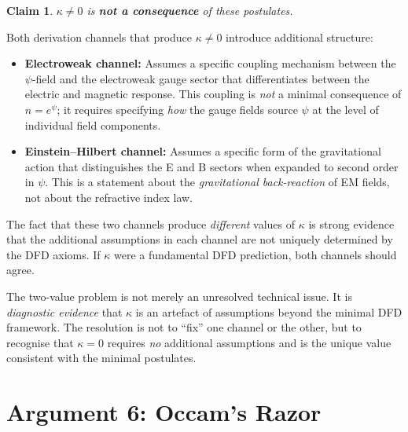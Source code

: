 \documentclass[12pt,a4paper]{article}
\newtheorem{claim}{Claim}
\theoremstyle{definition}
\theoremstyle{remark}
\begin{document}
\begin{claim}
$\kappa \neq 0$ is \textbf{not a consequence} of these postulates.
\end{claim}

Both derivation channels that produce $\kappa \neq 0$ introduce
additional structure:
\begin{itemize}
\item \textbf{Electroweak channel:} Assumes a specific coupling mechanism
  between the $\psi$-field and the electroweak gauge sector that
  differentiates between the electric and magnetic response.  This
  coupling is \emph{not} a minimal consequence of $n = e^\psi$; it
  requires specifying \emph{how} the gauge fields source $\psi$ at the
  level of individual field components.
\item \textbf{Einstein--Hilbert channel:} Assumes a specific form of the
  gravitational action that distinguishes the E and B sectors when
  expanded to second order in $\psi$.  This is a statement about the
  \emph{gravitational back-reaction} of EM fields, not about the
  refractive index law.
\end{itemize}

The fact that these two channels produce \emph{different} values of
$\kappa$ is strong evidence that the additional assumptions in each
channel are not uniquely determined by the DFD axioms.  If $\kappa$
were a fundamental DFD prediction, both channels should agree.

\begin{tcolorbox}[colback=yellow!5!white, colframe=yellow!60!black, title=The Two-Value Problem as Evidence]
The two-value problem is not merely an unresolved technical issue.
It is \emph{diagnostic evidence} that $\kappa$ is an artefact of
assumptions beyond the minimal DFD framework.  The resolution is not
to ``fix'' one channel or the other, but to recognise that $\kappa = 0$
requires \emph{no} additional assumptions and is the unique value
consistent with the minimal postulates.
\end{tcolorbox}

\section{Argument 6: Occam's Razor}
\label{sec:occam}
\end{document}

